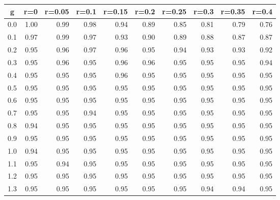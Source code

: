 %
\begin{table}[!tbp]
 \begin{center}
 \begin{tabular}{rrrrrrrrrr}\hline\hline
\multicolumn{1}{c}{g}&\multicolumn{1}{c}{r=0}&\multicolumn{1}{c}{r=0.05}&\multicolumn{1}{c}{r=0.1}&\multicolumn{1}{c}{r=0.15}&\multicolumn{1}{c}{r=0.2}&\multicolumn{1}{c}{r=0.25}&\multicolumn{1}{c}{r=0.3}&\multicolumn{1}{c}{r=0.35}&\multicolumn{1}{c}{r=0.4}\tabularnewline
\hline
0.0&1.00&0.99&0.98&0.94&0.89&0.85&0.81&0.79&0.76\tabularnewline
0.1&0.97&0.99&0.97&0.93&0.90&0.89&0.88&0.87&0.87\tabularnewline
0.2&0.95&0.96&0.97&0.96&0.95&0.94&0.93&0.93&0.92\tabularnewline
0.3&0.95&0.96&0.95&0.96&0.96&0.95&0.95&0.95&0.94\tabularnewline
0.4&0.95&0.95&0.95&0.96&0.95&0.95&0.95&0.95&0.95\tabularnewline
0.5&0.95&0.95&0.95&0.95&0.95&0.95&0.95&0.95&0.95\tabularnewline
0.6&0.95&0.95&0.95&0.95&0.95&0.95&0.95&0.95&0.95\tabularnewline
0.7&0.95&0.95&0.94&0.95&0.95&0.95&0.95&0.95&0.95\tabularnewline
0.8&0.94&0.95&0.95&0.95&0.95&0.95&0.95&0.95&0.95\tabularnewline
0.9&0.95&0.95&0.95&0.95&0.95&0.95&0.95&0.95&0.95\tabularnewline
1.0&0.94&0.95&0.95&0.95&0.95&0.95&0.95&0.95&0.95\tabularnewline
1.1&0.95&0.94&0.95&0.95&0.95&0.95&0.95&0.95&0.95\tabularnewline
1.2&0.95&0.95&0.95&0.95&0.95&0.95&0.95&0.95&0.95\tabularnewline
1.3&0.95&0.95&0.95&0.95&0.95&0.95&0.94&0.94&0.95\tabularnewline
\hline
\end{tabular}

\end{center}

\end{table}

